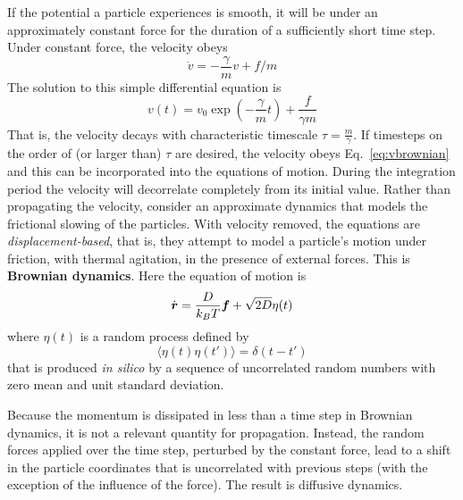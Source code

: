 If the potential a particle experiences is smooth, it will be under an approximately constant force for the duration of a sufficiently short time step.
Under constant force, the velocity obeys
\begin{equation}
\dot{v} = -\frac{\gamma}{m} v + f/m
\end{equation}
The solution to this simple differential equation is
\begin{equation}
v(t) = v_0 \exp(-\frac{\gamma}{m} t) + \frac{f}{\gamma m}
\label{eq:vbrownian}
\end{equation}
That is, the velocity decays with characteristic timescale $\tau=\frac{m}{\gamma}$.
If timesteps on the order of (or larger than) $\tau$ are desired, the velocity obeys Eq.~\ref{eq:vbrownian} and this can be incorporated into the equations of motion.
During the integration period the velocity will decorrelate completely from its initial value.
Rather than propagating the velocity, consider an approximate dynamics that models the frictional slowing of the particles. 
With velocity removed, the equations are {\it displacement-based}, that is, they attempt to model a particle's motion under friction, with thermal agitation, in the presence of external forces.
This is {\bf Brownian dynamics}. 
Here the equation of motion is 
\begin{equation}
\dot{\boldsymbol{r}} = \frac{D}{k_B T} \boldsymbol{f} + \sqrt{2 D} \eta(t)
\end{equation}
where $\eta(t)$ is a random process defined by
\begin{equation}
\langle \eta(t) \eta(t')\rangle = \delta(t-t')
\end{equation} 
that is produced {\it in silico} by a sequence of uncorrelated random numbers with zero mean and unit standard deviation.

Because the momentum is dissipated in less than a time step in Brownian dynamics, it is not a relevant quantity for propagation.
Instead, the random forces applied over the time step, perturbed by the constant force, lead to a shift in the particle coordinates that is uncorrelated with previous steps (with the exception of the influence of the force).
The result is diffusive dynamics.

